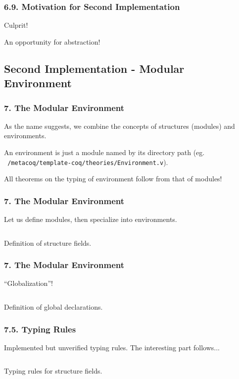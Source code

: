 \begin{frame}
  \frametitle{6.9. Motivation for Second Implementation}
  Culprit!
\begin{listing}[H]
  \caption{An opportunity for abstraction!}
\end{listing}
\end{frame}

\subsection{Second Implementation - Modular Environment}

\begin{frame}
  \frametitle{7. The Modular Environment}
  As the name suggests, we combine the concepts of structures (modules) and
  environments.\pause

  An environment is just a module \pause named by its directory path (eg.
  \texttt{~/metacoq/template-coq/theories/Environment.v}).\pause

  All theorems on the typing of environment follow from that of modules!
\end{frame}

\newcommand{\tcc}[3]{\inputminted[firstline={#1},lastline={#2},linenos]{Coq}{
  code/v2/template-coq/theories/#3}}
\newcommand{\pcuicc}[3]{\inputminted[firstline={#1},lastline={#2},linenos]{Coq}{
  code/v2/pcuic/theories/#3}}

\begin{frame}
  \frametitle{7. The Modular Environment}
  Let us define modules, then specialize into environments.
  \begin{listing}[H]
    \tcc{325}{332}{Environment.v}
      \caption{Definition of structure fields.}
    \end{listing}
\end{frame}

\begin{frame}
  \frametitle{7. The Modular Environment}
  ``Globalization''!
  \begin{listing}[H]
    \tcc{409}{412}{Environment.v}
    \caption{Definition of global declarations.}
  \end{listing}
\end{frame}

\begin{frame}
  \frametitle{7.5. Typing Rules}
  Implemented but unverified typing rules. The interesting part follows...
  \begin{listing}[H]
    \tcc{1271}{1282}{EnvironmentTyping.v}
    \caption{Typing rules for structure fields.}
  \end{listing}
\end{frame}

